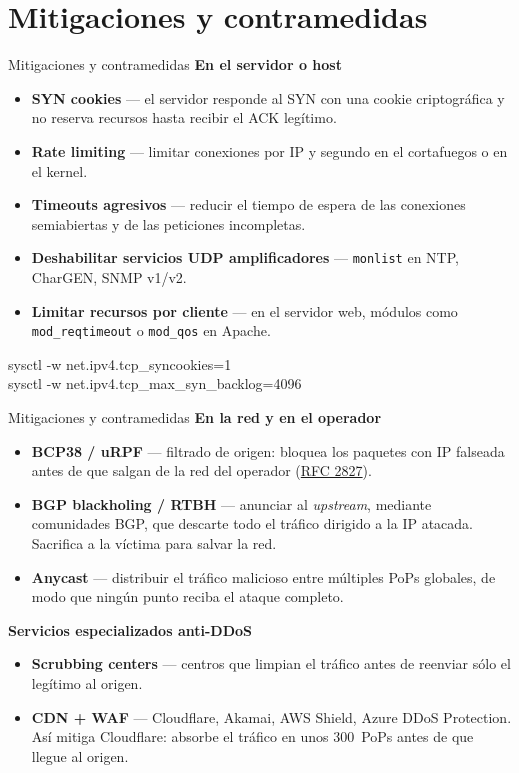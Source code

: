 \documentclass[aspectratio=169,11pt]{beamer}
\newcommand{\cmd}[1]{\texttt{\color{uznavy}#1}}
\newcommand{\cmdbox}[1]{%
  \begin{center}%
  {\setlength{\fboxsep}{6pt}\colorbox{uzlav!40}{\parbox{0.88\linewidth}{\ttfamily\footnotesize #1}}}%
  \end{center}}
\newcommand{\subt}[1]{{\color{uznavy}\bfseries #1}\par\smallskip}
\begin{document}
\section{Mitigaciones y contramedidas}

\begin{frame}{Mitigaciones y contramedidas}
\small
\subt{En el servidor o host}
  \begin{itemize}
  \item \textbf{SYN cookies} --- el servidor responde al SYN con una cookie criptográfica y no reserva recursos hasta recibir el ACK legítimo.
  \item \textbf{Rate limiting} --- limitar conexiones por IP y segundo en el cortafuegos o en el kernel.
  \item \textbf{Timeouts agresivos} --- reducir el tiempo de espera de las conexiones semiabiertas y de las peticiones incompletas.
  \item \textbf{Deshabilitar servicios UDP amplificadores} --- \cmd{monlist} en NTP, CharGEN, SNMP v1/v2.
  \item \textbf{Limitar recursos por cliente} --- en el servidor web, módulos como \cmd{mod\_reqtimeout} o \cmd{mod\_qos} en Apache.
  \end{itemize}
\vspace{-0.3em}
\cmdbox{sysctl -w net.ipv4.tcp\_syncookies=1\\ sysctl -w net.ipv4.tcp\_max\_syn\_backlog=4096}
\end{frame}

\begin{frame}{Mitigaciones y contramedidas}
\small
\subt{En la red y en el operador}
  \begin{itemize}
  \item \textbf{BCP38 / uRPF} --- filtrado de origen: bloquea los paquetes con IP falseada antes de que salgan de la red del operador (\href{https://datatracker.ietf.org/doc/html/rfc2827}{RFC 2827}).
  \item \textbf{BGP blackholing / RTBH} --- anunciar al \emph{upstream}, mediante comunidades BGP, que descarte todo el tráfico dirigido a la IP atacada. Sacrifica a la víctima para salvar la red.
  \item \textbf{Anycast} --- distribuir el tráfico malicioso entre múltiples PoPs globales, de modo que ningún punto reciba el ataque completo.
  \end{itemize}
\medskip
\subt{Servicios especializados anti-DDoS}
  \begin{itemize}
  \item \textbf{Scrubbing centers} --- centros que limpian el tráfico antes de reenviar sólo el legítimo al origen.
  \item \textbf{CDN + WAF} --- Cloudflare, Akamai, AWS Shield, Azure DDoS Protection. Así mitiga Cloudflare: absorbe el tráfico en unos 300~PoPs antes de que llegue al origen.
  \end{itemize}
\end{frame}
\end{document}
